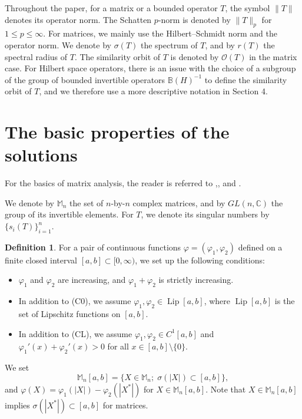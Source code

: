 \documentclass[12pt]{article}
\theoremstyle{definition}
\newtheorem{definition}[theorem]{Definition}
\numberwithin{equation}{section}
\newcommand{\B}{\mathbb{B}}
\newcommand{\C}{\mathbb{C}}
\newcommand{\M}{\mathbb{M}}
\newcommand{\cO}{\mathcal{O}} \newcommand{\cP}{\mathcal{P}}
\DeclareMathOperator{\Lip}{Lip}
\begin{document}
Throughout the paper, for a matrix or a bounded operator $T$, the symbol $\|T\|$ denotes its operator norm. 
The Schatten $p$-norm is denoted by $\|T\|_p$ for $1\leq p\leq \infty$. 
For matrices, we mainly use the Hilbert--Schmidt norm and the operator norm. 
We denote by $\sigma(T)$ the spectrum of $T$, and by $r(T)$ the spectral radius of $T$. 
The similarity orbit of $T$ is denoted by $\cO(T)$ in the matrix case. 
For Hilbert space operators, there is an issue with the choice of 
a subgroup of the group of bounded invertible operators $\B(H)^{-1}$ to define the similarity orbit of $T$, 
and we therefore use a more descriptive notation in Section 4.  
   
\section{The basic properties of the solutions}
For the basics of matrix analysis, the reader is referred to \cite{B1997},\cite{HP2014}, and \cite{HJ1991}.  

We denote by $\M_n$ the set of $n$-by-$n$ complex matrices, and by $GL(n,\C)$ the group of its invertible elements. 
For $T$, we denote its singular numbers by $\{s_i(T)\}_{i=1}^n$.  


\begin{definition} For a pair of continuous functions $\varphi=(\varphi_1,\varphi_2)$ defined 
on a finite closed interval $[a,b]\subset [0,\infty)$, we set up the following conditions: 
\begin{itemize}
\item[(C0)] $\varphi_1$ and $\varphi_2$ are increasing, and $\varphi_1+\varphi_2$ 
is strictly increasing.  
\item[(CL)] In addition to (C0), we assume $\varphi_1, \varphi_2\in \Lip[a,b]$, where 
$\Lip[a,b]$ is the set of Lipschitz functions on $[a,b]$. 
\item[(C1)] In addition to (CL), we assume $\varphi_1, \varphi_2\in C^1[a,b]$ and 
$\varphi_1'(x)+\varphi_2'(x)>0$ for all $x\in [a,b]\setminus \{0\}$. 
\end{itemize}
\end{definition}

We set 
\[\M_n[a,b]=\{X\in \M_n;\; \sigma(|X|)\subset [a,b]\},\] 
and $\varphi(X)=\varphi_1(|X|)-\varphi_2(|X^*|)$ for $X\in \M_n[a,b]$. 
Note that $X\in \M_n[a,b]$ implies $\sigma(|X^*|)\subset [a,b]$ for matrices. 
\end{document}
